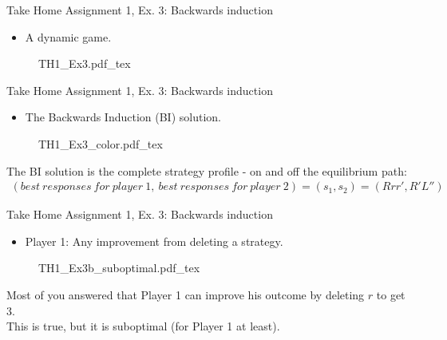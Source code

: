 \begin{frame}{Take Home Assignment 1, Ex. 3: Backwards induction}
  \begin{itemize}
    \item[3.] A dynamic game.
  \end{itemize}
  \begin{figure}[!h]
    \begin{center}
    \def\svgwidth{\columnwidth}
    {TH1_Ex3.pdf_tex}
    \end{center}
  \end{figure}
\end{frame}
\begin{frame}{Take Home Assignment 1, Ex. 3: Backwards induction}
  \begin{itemize}
    \item[(3a)] The Backwards Induction (BI) solution.
  \end{itemize}
  \begin{figure}[!h]
    \begin{center}
    \def\svgwidth{\columnwidth}
    {TH1_Ex3_color.pdf_tex}
    \end{center}
  \end{figure}
  The BI solution is the complete strategy profile - on and off the equilibrium path:
  \begin{align*}
    (best\ responses\ for\ player\ 1,\ best\ responses\ for\ player\ 2)=(s_1,s_2)=(Rrr',R'L'')
  \end{align*}
\end{frame}
\begin{frame}{Take Home Assignment 1, Ex. 3: Backwards induction}
  \begin{itemize}
    \item[(3b)] Player 1: Any improvement from deleting a strategy.
  \end{itemize}
  \begin{figure}[!h]
    \begin{center}
    \def\svgwidth{\columnwidth}
    {TH1_Ex3b_suboptimal.pdf_tex}
    \end{center}
  \end{figure}
  Most of you answered that Player 1 can improve his outcome by deleting $r$ to get 3.\\\medskip
  This is true, but it is suboptimal (for Player 1 at least).
\end{frame}
